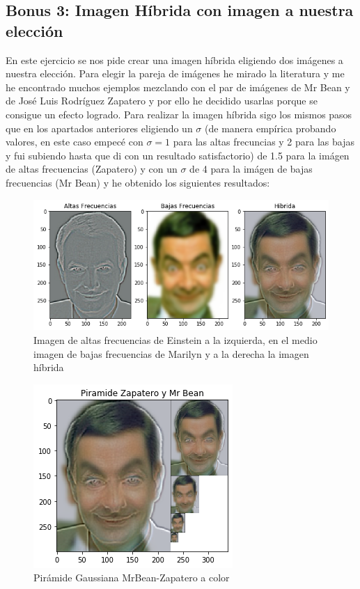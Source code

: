 \documentclass[12pt,spanish]{article}
\begin{document}
\subsection{Bonus 3: Imagen Híbrida con imagen a nuestra elección}
En este ejercicio se nos pide crear una imagen híbrida eligiendo dos imágenes a nuestra elección. Para elegir la pareja de imágenes he mirado la literatura y me he encontrado muchos ejemplos mezclando con el par de imágenes de Mr Bean y de José Luis Rodríguez Zapatero y por ello he decidido usarlas porque se consigue un efecto logrado. Para realizar la imagen híbrida sigo los mismos pasos que en los apartados anteriores eligiendo un $\sigma$ (de manera empírica probando valores, en este caso empecé con $\sigma=1$ para las altas frecuncias y 2 para las bajas y fui subiendo hasta que di con un resultado satisfactorio) de 1.5 para la imágen de altas frecuencias (Zapatero) y con un $\sigma$ de 4 para la imágen de bajas frecuencias (Mr Bean) y he obtenido los siguientes resultados:

\begin{figure}[H]
	\includegraphics[width=\textwidth]{./imagenes_memoria/b3a}
	\caption{Imagen de altas frecuencias de Einstein a la izquierda, en el medio imagen de bajas frecuencias de Marilyn y a la derecha la imagen híbrida}
	\label{bonus31}
\end{figure}

\begin{figure}[H]
	\centering
	\includegraphics[scale=1.1]{./imagenes_memoria/b3b}
	\caption{Pirámide Gaussiana MrBean-Zapatero a color}
	\label{bonus3b}
\end{figure}
\end{document}
